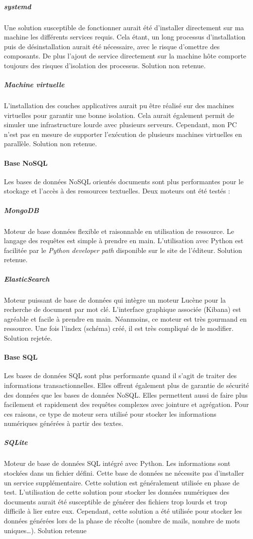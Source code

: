 			\subparagraph{systemd}
				Une solution susceptible de fonctionner aurait été d'installer directement sur ma machine les différents services requis.
				Cela étant, un long processus d'installation puis de désinstallation aurait été nécessaire, avec le risque d'omettre des composants.
				De plus l'ajout de service directement sur la machine hôte comporte toujours des risques d'isolation des processus.
				Solution non retenue.

			\subparagraph{Machine virtuelle}
				L'installation des couches applicatives aurait pu être réalisé sur des machines virtuelles pour garantir une bonne isolation.
				Cela aurait également permit de simuler une infrastructure lourde avec plusieurs serveurs.
				Cependant, mon PC n'est pas en mesure de supporter l’exécution de plusieurs machines virtuelles en parallèle.
				Solution non retenue.

		\paragraph{Base NoSQL}
				Les bases de données NoSQL orientés documents sont plus performantes pour le stockage et l'accès à des ressources textuelles.
				Deux moteurs ont été testés :
			\subparagraph{MongoDB}
				Moteur de base données flexible et raisonnable en utilisation de ressource.
				Le langage des requêtes est simple à prendre en main.
				L'utilisation avec Python est facilitée par le \emph{Python developer path} disponible sur le site de l'éditeur.
				Solution retenue.

			\subparagraph{ElasticSearch}
				Moteur puissant de base de données qui intègre un moteur Lucène pour la recherche de document par mot clé.
				L'interface graphique associée (Kibana) est agréable et facile à prendre en main.
				Néanmoins, ce moteur est très gourmand en ressource.
				Une fois l'index (schéma) créé, il est très compliqué de le modifier.
				Solution rejetée.

		\paragraph{Base SQL}
			Les bases de données SQL sont plus performante quand il s'agit de traiter des informations transactionnelles.
			Elles offrent également plus de garantie de sécurité des données que les bases de données NoSQL\@.
			Elles permettent aussi de faire plus facilement et rapidement des requêtes complexes avec jointure et agrégation.
			Pour ces raisons, ce type de moteur sera utilisé pour stocker les informations numériques générées à partir des textes.
			\subparagraph{SQLite}
				Moteur de base de données SQL intégré avec Python.
				Les informations sont stockées dans un fichier défini.
				Cette base de données ne nécessite pas d'installer un service supplémentaire.
				Cette solution est généralement utilisée en phase de test.
				L'utilisation de cette solution pour stocker les données numériques des documents aurait été susceptible de générer des fichiers trop lourds et trop difficile à lier entre eux.
				Cependant, cette solution a été utilisée pour stocker les données générées lors de la phase de récolte (nombre de mails, nombre de mots uniques\ldots).
				Solution retenue

